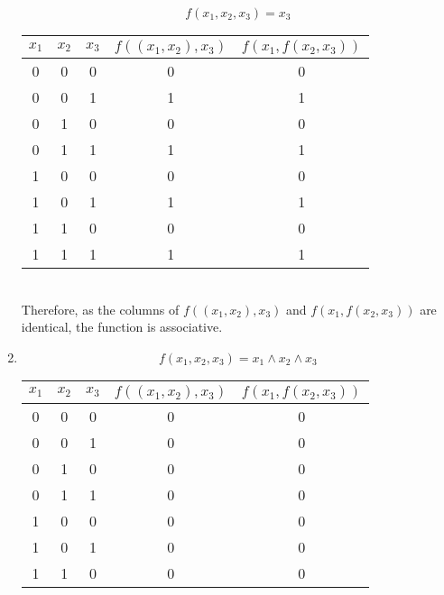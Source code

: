 \documentclass[fleqn, a4paper, 11pt, oneside]{amsart}
\theoremstyle{definition}
\theoremstyle{theorem}
\theoremstyle{remark}
\newcommand{\AND}{\wedge}
\begin{document}
\begin{solution}
\begin{enumerate}
\begin{equation*}
				f(x_1,x_2,x_3) = x_3
			\end{equation*}
			\begin{tabular}{|c|c|c||c|c|}
				\hline
				$x_1$  & $x_2$ & $x_3$ & $f((x_1,x_2),x_3)$ & $f(x_1,f(x_2,x_3))$ \\
				\hline
				0      & 0     & 0     & 0                  & 0                   \\
				0      & 0     & 1     & 1                  & 1                   \\
				0      & 1     & 0     & 0                  & 0                   \\
				0      & 1     & 1     & 1                  & 1                   \\
				1      & 0     & 0     & 0                  & 0                   \\
				1      & 0     & 1     & 1                  & 1                   \\
				1      & 1     & 0     & 0                  & 0                   \\
				1      & 1     & 1     & 1                  & 1                   \\
				\hline
			\end{tabular} \\
			Therefore, as the columns of $f((x_1,x_2),x_3)$ and $f(x_1,f(x_2,x_3))$ are identical, the function is associative.\\
		\item
			\begin{equation*}
				f(x_1,x_2,x_3) = x_1 \AND x_2 \AND x_3
			\end{equation*}
			\begin{tabular}{|c|c|c||c|c|}
				\hline
				$x_1$  & $x_2$ & $x_3$ & $f((x_1,x_2),x_3)$ & $f(x_1,f(x_2,x_3))$ \\
				\hline
				0      & 0     & 0     & 0                  & 0                   \\
				0      & 0     & 1     & 0                  & 0                   \\
				0      & 1     & 0     & 0                  & 0                   \\
				0      & 1     & 1     & 0                  & 0                   \\
				1      & 0     & 0     & 0                  & 0                   \\
				1      & 0     & 1     & 0                  & 0                   \\
				1      & 1     & 0     & 0                  & 0                   \\

\end{tabular}
\end{enumerate}
\end{solution}
\end{document}
